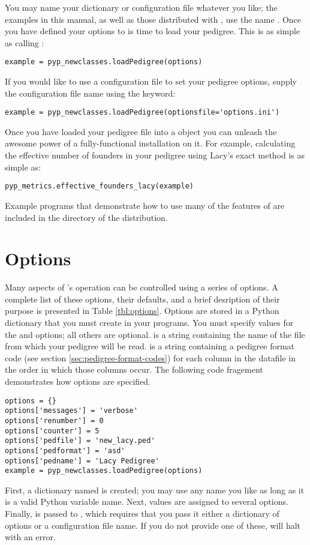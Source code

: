 You may name your dictionary or configuration file whatever you like; the examples in this manual, as well as those distributed with \PyPedal{}, use the name .  Once you have defined your options to is time to load your pedigree.  This is as simple as calling :
\begin{verbatim}
example = pyp_newclasses.loadPedigree(options)
\end{verbatim}
If you would like to use a configuration file to set your pedigree options, supply the configuration file name using the  keyword:
\begin{verbatim}
example = pyp_newclasses.loadPedigree(optionsfile='options.ini')
\end{verbatim}
Once you have loaded your pedigree file into a  object you can unleash the awesome power of a fully-functional \PyPedal{} installation on it.  For example, calculating the effective number of founders in your pedigree using Lacy's \citeyear{ref640} exact method is as simple as:
\begin{verbatim}
pyp_metrics.effective_founders_lacy(example)
\end{verbatim}
Example programs that demonstrate how to use many of the features of \PyPedal{} are included in the  directory of the distribution.
\section{Options}
\label{sec:pypedal-options}
Many aspects of \PyPedal{}'s operation can be controlled using a series of options.  A complete list of these options, their defaults, and a brief desription of their purpose is presented in Table \ref{tbl:options}.  Options are stored in a Python dictionary that you must create in your programs.  You must specify values for the  and  options; all others are optional.   is a string containing the name of the file from which your pedigree will be read.   is a string containing a pedigree format code (see section \ref{sec:pedigree-format-codes}) for each column in the datafile in the order in which those columns occur.  The following code fragement demonstrates how options are specified.
\begin{verbatim}
options = {}
options['messages'] = 'verbose'
options['renumber'] = 0
options['counter'] = 5
options['pedfile'] = 'new_lacy.ped'
options['pedformat'] = 'asd'
options['pedname'] = 'Lacy Pedigree'
example = pyp_newclasses.loadPedigree(options)
\end{verbatim}
First, a dictionary named  is created; you may use any name you like as long as it is a valid Python variable name.  Next, values are assigned to several options.  Finally,  is passed to , which requires that you pass it either a dictionary of options or a configuration file name.  If you do not provide one of these, \PyPedal{} will halt with an error.

